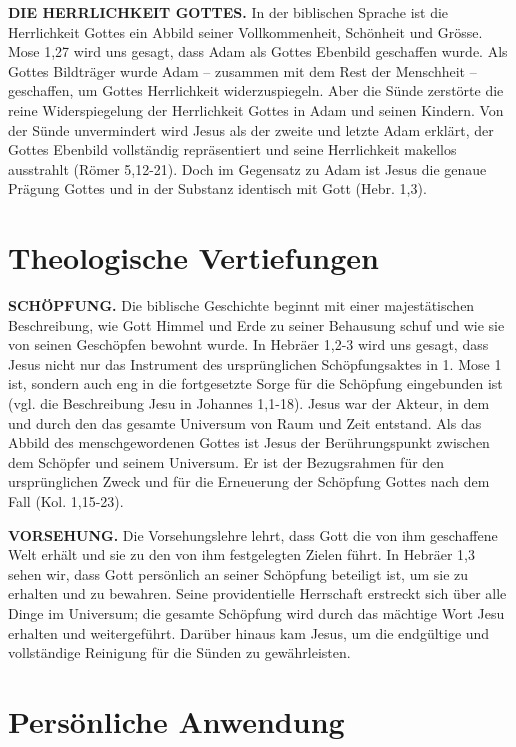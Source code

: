 \documentclass[]{krantz}
\begin{document}
\textbf{DIE HERRLICHKEIT GOTTES.} In der biblischen Sprache ist die
Herrlichkeit Gottes ein Abbild seiner Vollkommenheit, Schönheit und
Grösse. Mose 1,27 wird uns gesagt, dass Adam als Gottes Ebenbild
geschaffen wurde. Als Gottes Bildträger wurde Adam -- zusammen mit dem
Rest der Menschheit -- geschaffen, um Gottes Herrlichkeit
widerzuspiegeln. Aber die Sünde zerstörte die reine Widerspiegelung der
Herrlichkeit Gottes in Adam und seinen Kindern. Von der Sünde
unvermindert wird Jesus als der zweite und letzte Adam erklärt, der
Gottes Ebenbild vollständig repräsentiert und seine Herrlichkeit
makellos ausstrahlt (Römer 5,12-21). Doch im Gegensatz zu Adam ist Jesus
die genaue Prägung Gottes und in der Substanz identisch mit Gott (Hebr.
1,3).

\section{Theologische Vertiefungen}\label{theologische-vertiefungen}

\textbf{SCHÖPFUNG.} Die biblische Geschichte beginnt mit einer
majestätischen Beschreibung, wie Gott Himmel und Erde zu seiner
Behausung schuf und wie sie von seinen Geschöpfen bewohnt wurde. In
Hebräer 1,2-3 wird uns gesagt, dass Jesus nicht nur das Instrument des
ursprünglichen Schöpfungsaktes in 1. Mose 1 ist, sondern auch eng in die
fortgesetzte Sorge für die Schöpfung eingebunden ist (vgl. die
Beschreibung Jesu in Johannes 1,1-18). Jesus war der Akteur, in dem und
durch den das gesamte Universum von Raum und Zeit entstand. Als das
Abbild des menschgewordenen Gottes ist Jesus der Berührungspunkt
zwischen dem Schöpfer und seinem Universum. Er ist der Bezugsrahmen für
den ursprünglichen Zweck und für die Erneuerung der Schöpfung Gottes
nach dem Fall (Kol. 1,15-23).

\textbf{VORSEHUNG.} Die Vorsehungslehre lehrt, dass Gott die von ihm
geschaffene Welt erhält und sie zu den von ihm festgelegten Zielen
führt. In Hebräer 1,3 sehen wir, dass Gott persönlich an seiner
Schöpfung beteiligt ist, um sie zu erhalten und zu bewahren. Seine
providentielle Herrschaft erstreckt sich über alle Dinge im Universum;
die gesamte Schöpfung wird durch das mächtige Wort Jesu erhalten und
weitergeführt. Darüber hinaus kam Jesus, um die endgültige und
vollständige Reinigung für die Sünden zu gewährleisten.

\section{Persönliche Anwendung}\label{persuxf6nliche-anwendung}
\end{document}
